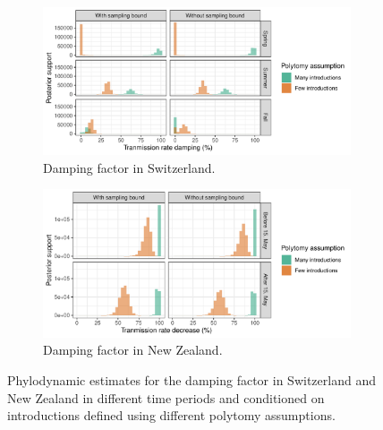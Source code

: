 \documentclass[9pt,twoside,lineno]{pnas-new}
\begin{document}
\begin{figure}[tbhp]
\centering
\begin{subfigure}[b]{0.75\textwidth}
\includegraphics[width=\linewidth]{figures/CHE_contact_tracing_factor.pdf}
\caption{Damping factor in Switzerland.}
\end{subfigure}
\begin{subfigure}[b]{0.75\textwidth}
\includegraphics[width=\linewidth]{figures/NZL_contact_tracing_factor.pdf}
\caption{Damping factor in New Zealand.}
\end{subfigure}
\caption{Phylodynamic estimates for the damping factor in Switzerland and New Zealand in different time periods and conditioned on introductions defined using different polytomy assumptions.}  
\label{fig:DampingFactorResults}
\end{figure}
\newpage
\end{document}
